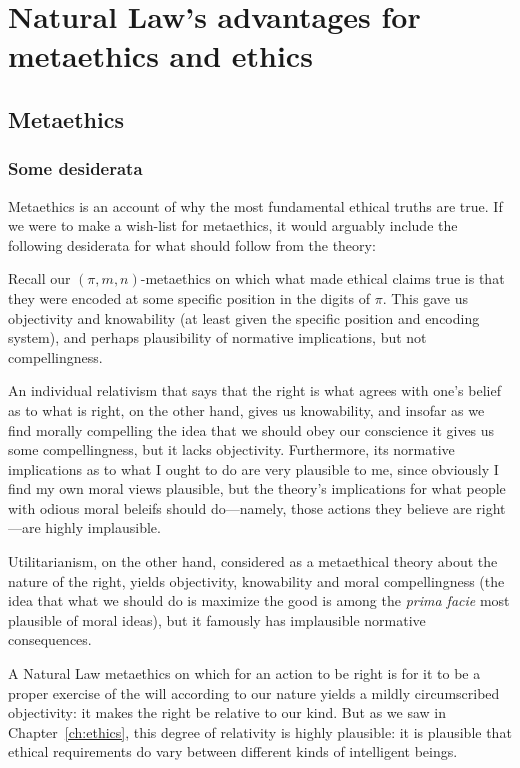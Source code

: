 \def\mychapter{III}
\chapter{Natural Law's advantages for metaethics and ethics}\label{ch:meta}
\section{Metaethics}
\subsection{Some desiderata}
Metaethics is an account of why the most fundamental ethical truths are true. If we were to make a wish-list
for metaethics, it would arguably include the following desiderata for what should follow from the theory:

Recall our $(\pi,m,n)$-metaethics on which what made ethical claims true is that they were encoded at some
specific position in the digits of $\pi$. This gave us objectivity and knowability (at least given
the specific position and encoding system), and perhaps plausibility of normative implications, but not
compellingness.

An individual relativism
that says that the right is what agrees with one's belief as to what is right,  on the
other hand, gives us knowability, and insofar as we find morally compelling the idea that we should obey
our conscience it gives us some compellingness, but it lacks objectivity. Furthermore, its normative implications as to
what I ought to do are very plausible to me, since obviously I find my own moral views plausible, but the theory's implications
for what people with odious moral beleifs should do---namely, those actions they believe are right---are highly implausible.

Utilitarianism, on the other hand, considered as a  metaethical theory about the nature of the right, yields objectivity, knowability
and moral compellingness (the idea that what we should do is maximize the good is among the \textit{prima facie} most plausible of moral ideas), but
it famously has  implausible normative consequences.

A Natural Law metaethics on which for an action to be right is for it to be a proper exercise of the will according to our nature
yields a mildly circumscribed objectivity: it makes the right be relative to our kind. But as we saw in Chapter~\ref{ch:ethics}, this degree
of relativity is highly plausible: it is plausible that ethical requirements do vary between different kinds of intelligent
beings.

